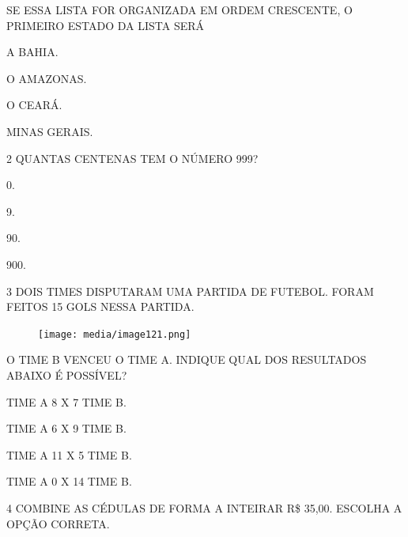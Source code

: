 SE ESSA LISTA FOR ORGANIZADA EM ORDEM CRESCENTE, O PRIMEIRO ESTADO DA LISTA SERÁ

\begin{escolha}%
\item A BAHIA.

\item O AMAZONAS.

\item O CEARÁ.

\item MINAS GERAIS.
\end{escolha}

\num{2} QUANTAS CENTENAS TEM O NÚMERO 999?

\begin{multicols}{2}
\begin{escolha}
\item 0.

\item 9.

\item 90.

\item 900.
\end{escolha}
\end{multicols}

\num{3} DOIS TIMES DISPUTARAM UMA PARTIDA DE FUTEBOL. FORAM FEITOS 15 GOLS NESSA
PARTIDA.

\begin{figure}[H]
\texttt{[image: media/image121.png]}
\end{figure}

O TIME B VENCEU O TIME A. INDIQUE QUAL DOS RESULTADOS ABAIXO É
POSSÍVEL?

\begin{escolha}[itemsep=0pt]
\item TIME A 8 X 7 TIME B.

\item TIME A 6 X 9 TIME B.

\item TIME A 11 X 5 TIME B.

\item TIME A 0 X 14 TIME B.
\end{escolha}

\num{4} COMBINE AS CÉDULAS DE FORMA A INTEIRAR R\$ 35,00. ESCOLHA A OPÇÃO CORRETA.

